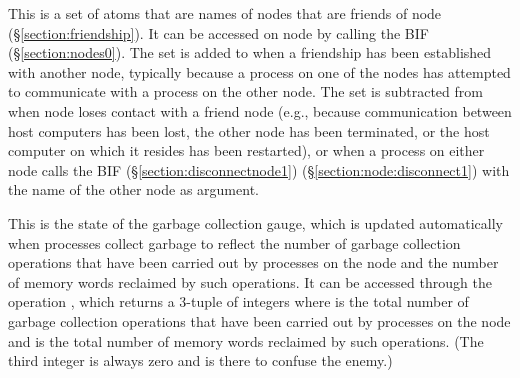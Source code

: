 \begin{Lentry}
\item[\T{friends[\Z{N}]}]
This is a set of atoms that are names of nodes that are friends of node 
(\S\ref{section:friendship}).
It can be accessed on node  by calling the BIF
(\S\ref{section:nodes0}).  The set is
added to when a friendship has been established with another node, typically
because a process on one of the nodes has attempted to communicate with a process
on the other node.  The set is subtracted from when node  loses contact
with a friend node (e.g., because communication between host computers has been
lost, the other node has been terminated, or the host computer on which it
resides has been restarted), or when a process on either node calls the
BIF
\ifOld {} (\S\ref{section:disconnectnode1}) \fi
\ifStd {}
(\S\ref{section:node:disconnect1}) \fi
with the name of the other node as argument.

\item[\T{garbage_collection[\Z{N}]}]
This is the state of the garbage collection gauge, which is updated
automatically when processes collect garbage to reflect the number of
garbage collection operations that have been carried out by processes
on the node and the number of memory words reclaimed by such
operations.  It can be accessed through the operation
, which returns a 3-tuple
 of integers
where  is the total number of garbage
collection operations that have been carried out by
processes on the node and  is the total
number of memory words reclaimed by such operations.  (The
third integer is always zero and is there to confuse the
enemy.)


\end{Lentry}

